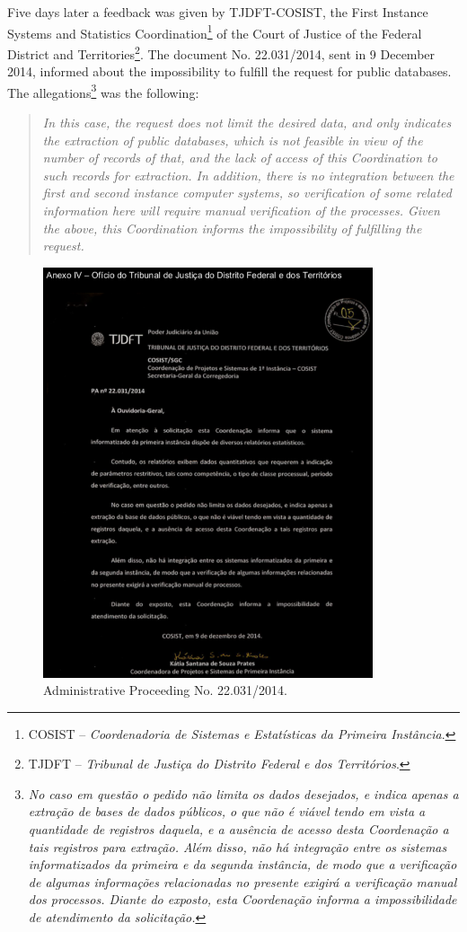 \documentclass[a4paper]{exam}
\theoremstyle{plain}
\begin{document}
Five days later a feedback was given by TJDFT-COSIST, the First Instance Systems and Statistics Coordination\footnote{ COSIST -- \textit{Coordenadoria de Sistemas e Estatísticas da Primeira Instância}.} of the Court of Justice of the Federal District and Territories\footnote{ TJDFT -- \textit{Tribunal de Justiça do Distrito Federal e dos Territórios}.}. The document No. 22.031/2014, sent in 9 December 2014, informed about the impossibility to fulfill the request for public databases. The allegations\footnote{ \textit{No caso em questão o pedido não limita os dados desejados, e indica apenas a extração de bases de dados públicos, o que não é viável tendo em vista a quantidade de registros daquela, e a ausência de acesso desta Coordenação a tais registros para extração. Além disso, não há integração entre os sistemas informatizados da primeira e da segunda instância, de modo que a verificação de algumas informações relacionadas no presente exigirá a verificação manual dos processos. Diante do exposto, esta Coordenação informa a impossibilidade de atendimento da solicitação.}} was the following:

\begin{quote}
\textit{In this case, the request does not limit the desired data, and only indicates the extraction of public databases, which is not feasible in view of the number of records of that, and the lack of access of this Coordination to such records for extraction. In addition, there is no integration between the first and second instance computer systems, so verification of some related information here will require manual verification of the processes. Given the above, this Coordination informs the impossibility of fulfilling the request.}
\end{quote}

\begin{figure}[!h]
  \begin{center}
    \includegraphics[width=9.7cm]{tjdft.png}
  \caption{Administrative Proceeding No. 22.031/2014.}
  \end{center}
\end{figure}
\end{document}
